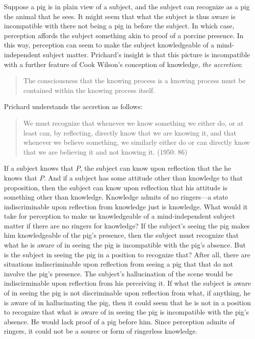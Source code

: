 \documentclass[11pt]{article}
\begin{document}
Suppose a pig is in plain view of a subject, and the subject can recognize as a pig the animal that he sees. It might seem that what the subject is thus aware is incompatible with there not being a pig in before the subject. In which case, perception affords the subject something akin to proof of a porcine presence. In this way, perception can seem to make the subject knowledgeable of a mind-independent subject matter. Prichard's insight is that this picture is incompatible with a further feature of Cook Wilson's conception of knowledge, \emph{the accretion}:
\begin{quote}
	The consciousness that the knowing process is a knowing process must be contained within the knowing process itself. \citep[107]{Cook-Wilson:1926sf}
\end{quote}
Prichard understands the accretion as follows:
\begin{quote}
	We must recognize that whenever we know something we either do, or at least can, by reflecting, directly know that we are knowing it, and that whenever we believe something, we similarly either do or can directly know that we are believing it and not knowing it. (1950: 86)
\end{quote}
If a subject knows that \( P \), the subject can know upon reflection that the he knows that \( P \). And if a subject has some attitude other than knowledge to that proposition, then the subject can know upon reflection that his attitude is something other than knowledge. Knowledge admits of no ringers---a state indiscriminable upon reflection from knowledge just is knowledge. What would it take for perception to make us knowledgeable of a mind-independent subject matter if there are no ringers for knowledge? If the subject's seeing the pig makes him knowledgeable of the pig's presence, then the subject must recognize that what he is aware of in seeing the pig is incompatible with the pig's absence. But is the subject in seeing the pig in a position to recognize that? After all, there are situations indiscriminable upon reflection from seeing a pig that that do not involve the pig's presence. The subject's hallucination of the scene would be indiscirminable upon reflection from his perceiving it. If what the subject is aware of in seeing the pig is not discriminable upon reflection from what, if anything, he is aware of in hallucinating the pig, then it could seem that he is not in a position to recognize that what is aware of in seeing the pig is incompatible with the pig's absence. He would lack proof of a pig before him. Since perception admits of ringers, it could not be a source or form of ringerless knowledge.
\end{document}
